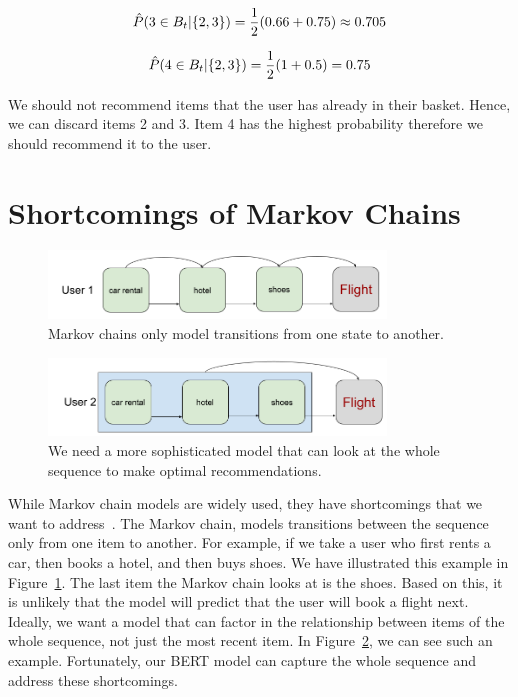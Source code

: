 \begin{equation*}
\setlength{\jot}{25pt}
    \hat{P}(3\in B_t| \{2,3\})=\frac{1}{2}(0.66+0.75) \approx 0.705
\end{equation*}

\begin{equation*}
\setlength{\jot}{25pt}
    \hat{P}(4\in B_t| \{2,3\})=\frac{1}{2}(1+0.5)=0.75
\end{equation*}

We should not recommend items that the user has already in their basket. Hence, we can discard items 2 and 3. Item 4 has the highest probability therefore we should recommend it to the user.

\section{Shortcomings of Markov Chains}

\begin{figure}[htbp]
\centering
\includegraphics[width=0.8\textwidth]{images/illustrations/markov_chains_shortcomings.png}
\caption{Markov chains only model transitions from one state to another.}
\label{fig:markov_chains_shortcomings}
\end{figure}

\begin{figure}[htbp]
\centering
\includegraphics[width=0.8\textwidth]{images/illustrations/markov_chains_shortcomings_2.png}
\caption{We need a more sophisticated model that can look at the whole sequence to make optimal recommendations.}
\label{fig:markov_chains_shortcomings_2}
\end{figure}

While Markov chain models are widely used, they have shortcomings that we want to address~\cite{tang2018personalized}. The Markov chain, models transitions between the sequence only from one item to another. For example, if we take a user who first rents a car, then books a hotel, and then buys shoes. We have illustrated this example in Figure~\ref{fig:markov_chains_shortcomings}. The last item the Markov chain looks at is the shoes. Based on this, it is unlikely that the model will predict that the user will book a flight next. Ideally, we want a model that can factor in the relationship between items of the whole sequence, not just the most recent item. In Figure~\ref{fig:markov_chains_shortcomings_2}, we can see such an example. Fortunately, our BERT model can capture the whole sequence and address these shortcomings.